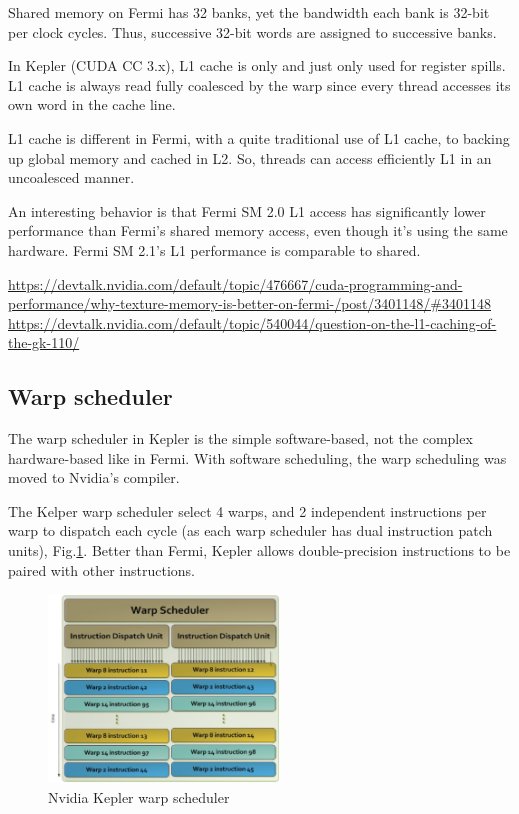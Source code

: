 \begin{mdframed}
Shared memory on Fermi has 32 banks, yet the bandwidth each bank is 32-bit per
clock cycles. Thus, successive 32-bit words are assigned to successive banks.
\end{mdframed}

In Kepler (CUDA CC 3.x), L1 cache is only and just only used for register
spills. L1 cache is always read fully coalesced by the warp since every thread
accesses its own word in the cache line. 

\begin{mdframed}
L1 cache is different in Fermi, with a quite traditional use of L1 cache, to
backing up global memory and cached in L2. So, threads can access efficiently L1 in an
uncoalesced manner.

An interesting behavior is that Fermi SM 2.0 L1 access has significantly lower
performance than Fermi's shared memory access, even though it's using the same
hardware. Fermi SM 2.1's L1 performance is comparable to shared.
\end{mdframed}
\url{https://devtalk.nvidia.com/default/topic/476667/cuda-programming-and-performance/why-texture-memory-is-better-on-fermi-/post/3401148/#3401148}
\url{https://devtalk.nvidia.com/default/topic/540044/question-on-the-l1-caching-of-the-gk-110/}


\subsection{Warp scheduler}
\label{sec:Kepler_warpscheduler}

The warp scheduler in Kepler is the simple software-based, not the
complex hardware-based like in Fermi. With software scheduling, the warp
scheduling was moved to Nvidia's compiler.

The Kelper warp scheduler select 4 warps, and 2 independent instructions per
warp to dispatch each cycle (as each warp scheduler has dual instruction patch
units), Fig.\ref{fig:Kepler_warpscheduler}.
Better than Fermi, Kepler allows double-precision instructions to be paired with
other instructions.


\begin{figure}[hbt]
  \centerline{\includegraphics[height=5cm,
    angle=0]{./images/Kepler_warpscheduler.eps}}
  \caption{Nvidia Kepler warp scheduler}
  \label{fig:Kepler_warpscheduler}
\end{figure}


